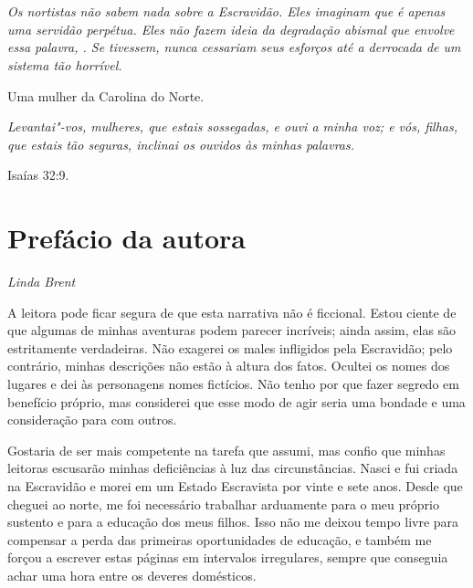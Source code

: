 \chapter*{}

\thispagestyle{empty}
\vspace*{\fill}

\epigraph{\emph{Os nortistas não sabem nada sobre a
Escravidão. Eles imaginam que é apenas uma servidão perpétua. Eles não
fazem ideia da degradação abismal que envolve essa palavra,
. Se tivessem, nunca cessariam seus esforços até a derrocada
de um sistema tão horrível.}}{Uma mulher da Carolina do Norte.}

\epigraph{\emph{Levantai"-vos, mulheres, que estais
sossegadas, e ouvi a minha voz; e vós, filhas, que estais tão seguras,
inclinai os ouvidos às minhas palavras.}}{Isaías 32:9.}

\chapter{Prefácio da autora}

\begin{flushright}
\emph{Linda Brent}
\end{flushright}

A leitora pode ficar segura de que esta
narrativa não é ficcional. Estou ciente de que algumas de minhas
aventuras podem parecer incríveis; ainda assim, elas são estritamente
verdadeiras. Não exagerei os males infligidos pela Escravidão; pelo
contrário, minhas descrições não estão à altura dos fatos. Ocultei os
nomes dos lugares e dei às personagens nomes fictícios. Não tenho por
que fazer segredo em benefício próprio, mas considerei que esse modo de
agir seria uma bondade e uma consideração para com outros.

Gostaria de ser mais competente na
tarefa que assumi, mas confio que minhas leitoras escusarão minhas
deficiências à luz das circunstâncias. Nasci e fui criada na Escravidão
e morei em um Estado Escravista por vinte e sete anos. Desde que cheguei
ao norte, me foi necessário trabalhar arduamente para o meu próprio
sustento e para a educação dos meus filhos. Isso não me deixou tempo
livre para compensar a perda das primeiras oportunidades de educação, e
também me forçou a escrever estas páginas em intervalos irregulares,
sempre que conseguia achar uma hora entre os deveres domésticos.


